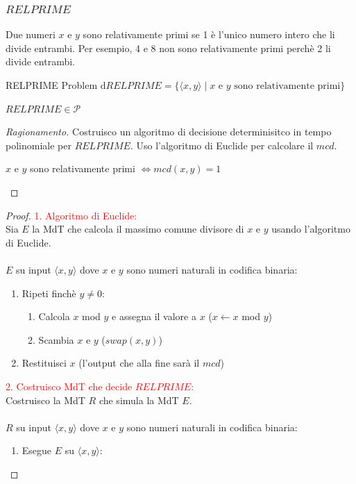 \documentclass{article}  %
\theoremstyle{definition}
\newenvironment{ragionamento}[1][]
  {\begin{proof}[Ragionamento#1]\renewcommand{\qedsymbol}{}\normalfont}
  {\end{proof}}
\begin{document}
\subsubsection{$RELPRIME$}
Due numeri $x$ e $y$ sono relativamente primi se 1 è l'unico numero intero che li divide entrambi. Per esempio, 4 e 8 non sono relativamente primi perchè 2 li divide entrambi.
\begin{theorem}{RELPRIME Problem}
	d$RELPRIME = \{\langle x,y \rangle \mid x \text{ e } y \text{ sono relativamente primi}\}$
	\begin{center}
		$RELPRIME \in \mathcal{P}$
	\end{center}
	\footnotesize
	\begin{ragionamento}
		Costruisco un algoritmo di decisione determinisitco in tempo polinomiale per $RELPRIME$. Uso l'algoritmo di Euclide per calcolare il $mcd$.
		\begin{center}
			$x$ e $y$ sono relativamente primi $\iff mcd(x,y)=1$
		\end{center}
	\end{ragionamento}
	\begin{proof}
		\textcolor{red}{1. Algoritmo di Euclide:} \\
		Sia $E$ la MdT che calcola il massimo comune divisore di $x$ e $y$ usando l'algoritmo di Euclide. \\ \\
		$E$ su input $\langle x,y \rangle$ dove $x$ e $y$ sono numeri naturali in codifica binaria:
		\begin{enumerate}
			\item Ripeti finchè $y \neq 0$:
			      \begin{enumerate}
				      \item Calcola $x$ mod $y$ e assegna il valore a $x$ ($x \leftarrow x$ mod $y$)
				      \item Scambia $x$ e $y$ ($swap(x,y)$)
			      \end{enumerate}
			\item Restituisci $x$ (l'output che alla fine sarà il $mcd$)
		\end{enumerate}
		\textcolor{red}{2. Costruisco MdT che decide $RELPRIME$:} \\
		Costruisco la MdT $R$ che simula la MdT $E$. \\ \\
		$R$ su input $\langle x,y \rangle$ dove $x$ e $y$ sono numeri naturali in codifica binaria:
		\begin{enumerate}
			\item Esegue $E$ su $\langle x,y \rangle$:

\end{enumerate}
\end{proof}
\end{theorem}
\end{document}

